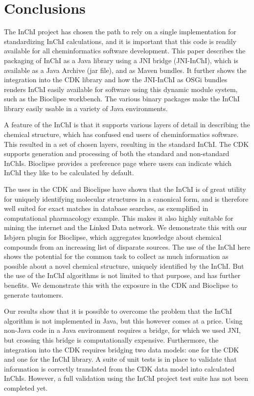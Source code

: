 \documentclass[10pt]{bmc_article}
\newenvironment{bmcformat}{\fussy\setboolean{publ}{true}}{\fussy}
\begin{document}
\begin{bmcformat}
\section*{Conclusions}
The InChI project has chosen the path to rely on a single implementation for standardizing InChI calculations,
and it is important that this code is readily available for all cheminformatics software development. This paper
describes the packaging of InChI as a Java library using a JNI bridge (JNI-InChI), which is available as a Java
Archive (jar file), and as Maven bundles. It further shows the integration into the CDK library and
how the JNI-InChI as OSGi bundles renders InChI easily available for software using this dynamic module system,
such as the Bioclipse workbench. The various binary packages make the InChI library easily usable in
a variety of Java environments.

A feature of the InChI is that it supports various layers of detail in describing the chemical structure,
which has confused end users of cheminformatics software. This resulted in a set of chosen layers, resulting
in the standard InChI. The CDK supports generation and processing of both the standard and non-standard InChIs.
Bioclipse provides a preference page where users can indicate which InChI they like to be calculated by
default.

The uses in the CDK and Bioclipse have shown that the InChI is of great utility for uniquely identifying
molecular structures in a canonical form, and is therefore well suited for exact matches in database searches, 
as exemplified in computational pharmacology example. This makes it also highly suitable for mining the
internet and the Linked Data network. We demonstrate this with our Isbjørn plugin for Bioclipse, which
aggregates knowledge about chemical compounds from an increasing list of disparate sources. The use of the
InChI here shows the potential for the common task to collect as much information as possible about a
novel chemical structure, uniquely identified by the InChI. But the use of the InChI algorithms is not limited to
that purpose, and has further benefits. We demonstrate this with the exposure in the CDK and Bioclipse to
generate tautomers. 

Our results show that it is possible to overcome the problem that the InChI algorithm is not implemented
in Java, but this however comes at a price. Using non-Java code in a Java environment requires a bridge, for which
we used JNI, but crossing this bridge is computationally expensive. Furthermore, the integration into the
CDK requires bridging two data models: one for the CDK and one for the InChI library. A suite of unit
tests is in place to validate that information is correctly translated from the CDK data model into
calculated InChIs. However, a full validation using the InChI project test suite has not been completed
yet.


\end{bmcformat}
\end{document}
